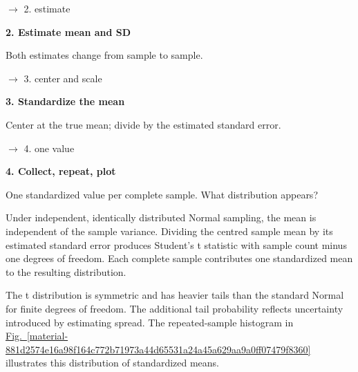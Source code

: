 \documentclass[11pt,a4paper]{article}
\begin{document}
\par\noindent $\longrightarrow$ 2. estimate
\par\medskip\noindent\textcolor{pcd2}{\textbf{2. Estimate mean and SD}}\par
Both estimates change from sample to sample.

\par\noindent $\longrightarrow$ 3. center and scale
\par\medskip\noindent\textcolor{pcd3}{\textbf{3. Standardize the mean}}\par
Center at the true mean; divide by the estimated standard error.

\par\noindent $\longrightarrow$ 4. one value
\par\medskip\noindent\textcolor{pcd4}{\textbf{4. Collect, repeat, plot}}\par
One standardized value per complete sample. What distribution appears?


\medskip

Under independent, identically distributed Normal sampling, the mean is independent of the sample variance. Dividing the centred sample mean by its estimated standard error produces Student's t statistic with sample count minus one degrees of freedom. Each complete sample contributes one standardized mean to the resulting distribution.


The t distribution is symmetric and has heavier tails than the standard Normal for finite degrees of freedom. The additional tail probability reflects uncertainty introduced by estimating spread. The repeated-sample histogram in \hyperref[material-881d2574e16a98f164c772b71973a44d65531a24a45a629aa9a0ff07479f8360]{Fig.~\ref*{material-881d2574e16a98f164c772b71973a44d65531a24a45a629aa9a0ff07479f8360}} illustrates this distribution of standardized means.
\end{document}

